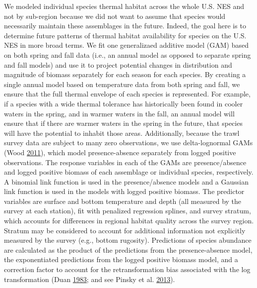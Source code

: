 \documentclass[
]{book}
\begin{document}
We modeled individual species thermal habitat across the whole U.S. NES and not by sub-region because we did not want to assume that species would necessarily maintain these assemblages in the future. Indeed, the goal here is to determine future patterns of thermal habitat availability for species on the U.S. NES in more broad terms. We fit one generalizaed additive model (GAM) based on both spring and fall data (i.e., an annual model as opposed to separate spring and fall models) and use it to project potential changes in distribution and magnitude of biomass separately for each season for each species. By creating a single annual model based on temperature data from both spring and fall, we ensure that the full thermal envelope of each species is represented. For example, if a species with a wide thermal tolerance has historically been found in cooler waters in the spring, and in warmer waters in the fall, an annual model will ensure that if there are warmer waters in the spring in the future, that species will have the potential to inhabit those areas. Additionally, because the trawl survey data are subject to many zero observations, we use delta-lognormal GAMs (Wood \protect\hyperlink{ref-Wood2011a}{2011}), which model presence-absence separately from logged positive observations. The response variables in each of the GAMs are presence/absence and logged positive biomass of each assemblage or individual species, respectively. A binomial link function is used in the presence/absence models and a Gaussian link function is used in the models with logged positive biomass.
The predictor variables are surface and bottom temperature and depth (all measured by the survey at each station), fit with penalized regression splines, and survey stratum, which accounts for differences in regional habitat quality across the survey region. Stratum may be considered to account for additional information not explicitly measured by the survey (e.g., bottom rugosity). Predictions of species abundance are calculated as the product of the predictions from the presence-absence model, the exponentiated predictions from the logged positive biomass model, and a correction factor to account for the retransformation bias associated with the log transformation (Duan \protect\hyperlink{ref-Duan1983}{1983}; and see Pinsky et al. \protect\hyperlink{ref-Pinsky2013}{2013}).
\end{document}
